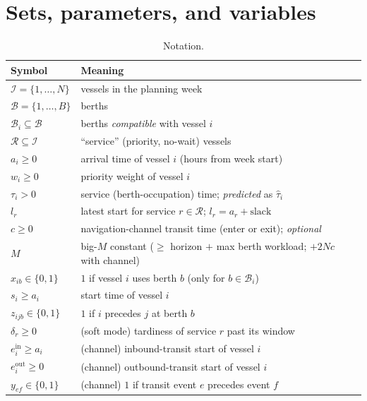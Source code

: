 \documentclass[11pt]{article}
\newcommand{\I}{\mathcal{I}}
\newcommand{\B}{\mathcal{B}}
\newcommand{\R}{\mathcal{R}}
\newcommand{\Bi}{\mathcal{B}_i}
\newcommand{\bigM}{M}
\begin{document}
\section{Sets, parameters, and variables}
\begin{table}[h]
\centering
\small
\begin{tabular}{@{}ll@{}}
\toprule
Symbol & Meaning \\
\midrule
$\I=\{1,\dots,N\}$ & vessels in the planning week \\
$\B=\{1,\dots,B\}$ & berths \\
$\Bi\subseteq\B$ & berths \emph{compatible} with vessel $i$ \\
$\R\subseteq\I$ & ``service'' (priority, no-wait) vessels \\
$a_i\ge 0$ & arrival time of vessel $i$ (hours from week start) \\
$w_i\ge 0$ & priority weight of vessel $i$ \\
$\tau_i>0$ & service (berth-occupation) time; \emph{predicted} as $\hat\tau_i$ \\
$l_r$ & latest start for service $r\in\R$; $l_r=a_r+\text{slack}$ \\
$c\ge 0$ & navigation-channel transit time (enter or exit); \emph{optional} \\
$\bigM$ & big-$M$ constant ($\ge$ horizon $+$ max berth workload; $+2Nc$ with channel) \\
\midrule
$x_{ib}\in\{0,1\}$ & $1$ if vessel $i$ uses berth $b$ \quad(only for $b\in\Bi$) \\
$s_i\ge a_i$ & start time of vessel $i$ \\
$z_{ijb}\in\{0,1\}$ & $1$ if $i$ precedes $j$ at berth $b$ \\
$\delta_r\ge 0$ & (soft mode) tardiness of service $r$ past its window \\
$e^{\mathrm{in}}_i\ge a_i$ & (channel) inbound-transit start of vessel $i$ \\
$e^{\mathrm{out}}_i\ge 0$ & (channel) outbound-transit start of vessel $i$ \\
$y_{ef}\in\{0,1\}$ & (channel) $1$ if transit event $e$ precedes event $f$ \\
\bottomrule
\end{tabular}
\caption{Notation.}
\end{table}
\end{document}
